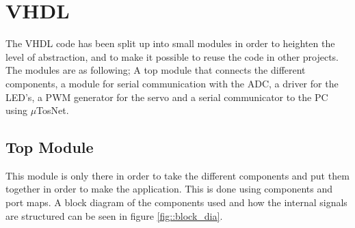 \section{VHDL}
The VHDL code has been split up into small modules in order to heighten the level of abstraction, and to make it possible to reuse the code in other projects. 
The modules are as following; A top module that connects the different components, a module for serial communication with the ADC, a driver for the LED's, a PWM generator for the servo and a serial communicator to the PC using $\mu$TosNet.
\subsection{Top Module}
This module is only there in order to take the different components and put them together in order to make the application. This is done using components and port maps. A block diagram of the components used and how the internal signals are structured can be seen in figure \ref{fig::block_dia}.
